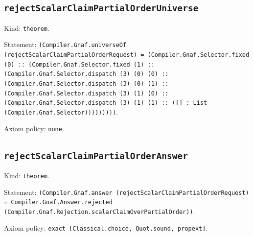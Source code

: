 \documentclass[11pt]{article}
\begin{document}
\subsection*{\texttt{rejectScalarClaimPartialOrderUniverse}}
\noindent Kind: \texttt{theorem}.\par
\noindent Statement: \texttt{(Compiler.Gnaf.universeOf (rejectScalarClaimPartialOrderRequest) = (Compiler.Gnaf.Selector.fixed (0) :: (Compiler.Gnaf.Selector.fixed (1) :: (Compiler.Gnaf.Selector.dispatch (3) (0) (0) :: (Compiler.Gnaf.Selector.dispatch (3) (0) (1) :: (Compiler.Gnaf.Selector.dispatch (3) (1) (0) :: (Compiler.Gnaf.Selector.dispatch (3) (1) (1) :: ([] : List (Compiler.Gnaf.Selector)))))))))}.\par
\noindent Axiom policy: \texttt{none}.\par
\subsection*{\texttt{rejectScalarClaimPartialOrderAnswer}}
\noindent Kind: \texttt{theorem}.\par
\noindent Statement: \texttt{(Compiler.Gnaf.answer (rejectScalarClaimPartialOrderRequest) = Compiler.Gnaf.Answer.rejected (Compiler.Gnaf.Rejection.scalarClaimOverPartialOrder))}.\par
\noindent Axiom policy: \texttt{exact [Classical.choice, Quot.sound, propext]}.\par
\end{document}
